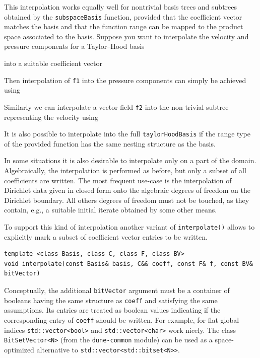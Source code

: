 \documentclass[a4paper,10pt,headings=normal,bibliography=totoc]{scrartcl}
\newcommand{\cpp}[1]{\lstinline[basicstyle=\ttfamily]!#1!}
\newcommand{\dunemodule}[1]{\texttt{#1}}
\begin{document}
This interpolation works equally well for nontrivial basis trees
and subtrees obtained by the \cpp{subspaceBasis} function,
provided that the coefficient vector matches the basis
and that the function range can be mapped to the product space
associated to the basis.
Suppose you want to interpolate
the velocity and pressure components for a Taylor--Hood basis
%

%
into a suitable coefficient vector
%

%
Then interpolation of \cpp{f1} into the pressure components can simply
be achieved using
%

%
Similarly we can interpolate a vector-field \cpp{f2}
into the non-trivial subtree representing the velocity using
%

%
It is also possible to interpolate into the full \cpp{taylorHoodBasis}
if the range type of the provided function has the same nesting structure
as the basis.


In some situations it is also desirable to interpolate only on a part of the domain.  Algebraically, the interpolation
is performed as before, but only a subset of all coefficients are written.  The most frequent use-case is the interpolation
of Dirichlet data given in closed form onto the algebraic degrees of freedom on the Dirichlet boundary.  All others
degrees of freedom must not be touched, as they contain, e.g., a suitable initial iterate obtained by some other
means.

To support this kind of interpolation another variant of
\cpp{interpolate()} allows to explicitly mark a subset of
coefficient vector entries to be written.
\begin{lstlisting}[style=Interface]
template <class Basis, class C, class F, class BV>
void interpolate(const Basis& basis, C&& coeff, const F& f, const BV& bitVector)
\end{lstlisting}
Conceptually, the additional \cpp{bitVector}
argument must be a container of booleans having
the same structure as \cpp{coeff} and satisfying
the same assumptions.  Its entries are treated as boolean
values indicating if the corresponding entry of \cpp{coeff}
should be written.
For example, for flat global indices \cpp{std::vector<bool>} and
\cpp{std::vector<char>} work nicely.
The class \cpp{BitSetVector<N>} (from the \dunemodule{dune-common} module) can be used
as a space-optimized alternative to \cpp{std::vector<std::bitset<N>>}.
\end{document}
